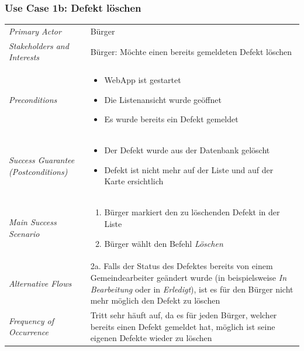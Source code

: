 \subsubsection{Use Case 1b: Defekt löschen}

\renewcommand{\arraystretch}{2}
\begin{longtable}{p{0.25\twocelltabwidth}p{0.75\twocelltabwidth}}
\textit{Primary Actor} & Bürger \\ 
\textit{Stakeholders and Interests} & Bürger: Möchte einen bereits gemeldeten Defekt löschen \\ 
\textit{Preconditions} & \begin{itemize}[noitemsep, nosep, leftmargin=12pt, before*={\mbox{}\vspace{-\baselineskip}}, after*={\mbox{}\vspace{-\baselineskip}}]
\item \gls{WebApp} ist gestartet
\item Die Listenansicht wurde geöffnet 
\item Es wurde bereits ein Defekt gemeldet
\end{itemize} \\ 
\textit{Success Guarantee (Postconditions)} & \begin{itemize}[noitemsep, nosep, leftmargin=12pt, before*={\mbox{}\vspace{-\baselineskip}}, after*={\mbox{}\vspace{-\baselineskip}}]
\item Der Defekt wurde aus der Datenbank gelöscht
\item Defekt ist nicht mehr auf der Liste und auf der Karte ersichtlich
\end{itemize} \\ 
\textit{Main Success Scenario} & \begin{enumerate}[noitemsep, nosep, leftmargin=12pt, before*={\mbox{}\vspace{-\baselineskip}}, after*={\mbox{}\vspace{-\baselineskip}}]
\item Bürger markiert den zu löschenden Defekt in der Liste
\item Bürger wählt den Befehl \emph{Löschen}
\end{enumerate} \\ 
\textit{Alternative Flows} & 2a. Falls der Status des Defektes bereits von einem Gemeindearbeiter geändert wurde (in beispielsweise \emph{In Bearbeitung} oder in \emph{Erledigt}), ist es für den Bürger nicht mehr möglich den Defekt zu löschen \\ 
\textit{Frequency of Occurrence} & Tritt sehr häuft auf, da es für jeden Bürger, welcher bereits einen Defekt gemeldet hat, möglich ist seine eigenen Defekte wieder zu löschen \\ 
\end{longtable} 
\renewcommand{\arraystretch}{1.3}

